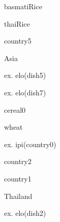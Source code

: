 \documentclass[a4paper,portrait,12pt]{article}
\begin{document}
\begin{flushleft}
basmatiRice
\end{flushleft}





\begin{flushleft}
thaiRice
\end{flushleft}





\begin{flushleft}
country5
\end{flushleft}


\begin{flushleft}
Asia
\end{flushleft}


\begin{flushleft}
ex. elo(dish5)
\end{flushleft}


\begin{flushleft}
ex. elo(dish7)
\end{flushleft}





\begin{flushleft}
cereal0
\end{flushleft}


\begin{flushleft}
wheat
\end{flushleft}


\begin{flushleft}
ex. ipi(country0)
\end{flushleft}





\begin{flushleft}
country2
\end{flushleft}





\begin{flushleft}
country1
\end{flushleft}





\begin{flushleft}
Thailand
\end{flushleft}


\begin{flushleft}
ex. elo(dish2)
\end{flushleft}
\end{document}
